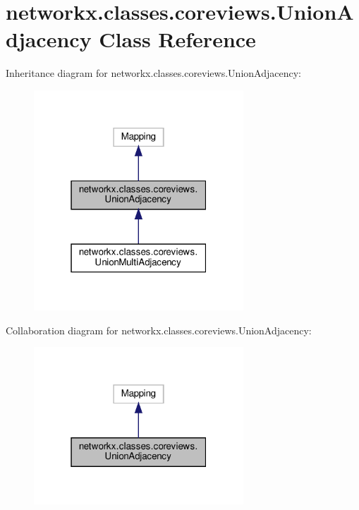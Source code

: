 \hypertarget{classnetworkx_1_1classes_1_1coreviews_1_1UnionAdjacency}{}\section{networkx.\+classes.\+coreviews.\+Union\+Adjacency Class Reference}
\label{classnetworkx_1_1classes_1_1coreviews_1_1UnionAdjacency}


Inheritance diagram for networkx.\+classes.\+coreviews.\+Union\+Adjacency\+:
\nopagebreak
\begin{figure}[H]
\begin{center}
\leavevmode
\includegraphics[width=223pt]{classnetworkx_1_1classes_1_1coreviews_1_1UnionAdjacency__inherit__graph}
\end{center}
\end{figure}


Collaboration diagram for networkx.\+classes.\+coreviews.\+Union\+Adjacency\+:
\nopagebreak
\begin{figure}[H]
\begin{center}
\leavevmode
\includegraphics[width=223pt]{classnetworkx_1_1classes_1_1coreviews_1_1UnionAdjacency__coll__graph}
\end{center}
\end{figure}
